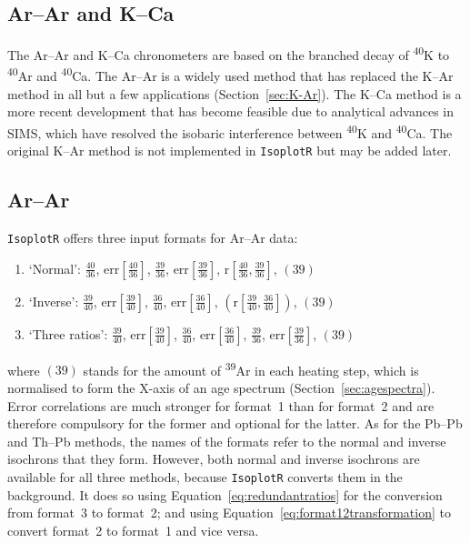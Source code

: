 \begin{refsection}

\chapter{Ar--Ar and K--Ca}\label{ch:ArArKCa}

The Ar--Ar and K--Ca chronometers are based on the branched decay of
\textsuperscript{40}K to \textsuperscript{40}Ar and
\textsuperscript{40}Ca. The Ar--Ar is a widely used method that has
replaced the K--Ar method in all but a few applications
(Section~\ref{sec:K-Ar}). The K--Ca method is a more recent
development that has become feasible due to analytical advances in
SIMS, which have resolved the isobaric interference between
\textsuperscript{40}K and \textsuperscript{40}Ca. The original K--Ar
method is not implemented in \texttt{IsoplotR} but may be added later.

\section{Ar--Ar}

\texttt{IsoplotR} offers three input formats for Ar--Ar data:
\begin{enumerate}
\item{`Normal':}
  $\frac{40}{36}$,  
  $\mbox{err}\!\left[\frac{40}{36}\right]$, 
  $\frac{39}{36}$,  
  $\mbox{err}\!\left[\frac{39}{36}\right]$,  
  $\mbox{r}\!\left[\frac{40}{36},\frac{39}{36}\right]$,
  $\left(39\right)$
\item{`Inverse':}
  $\frac{39}{40}$,  
  $\mbox{err}\!\left[\frac{39}{40}\right]$, 
  $\frac{36}{40}$,  
  $\mbox{err}\!\left[\frac{36}{40}\right]$,  
  $\left(\mbox{r}\!\left[\frac{39}{40},\frac{36}{40}\right]\right)$,
  $\left(39\right)$
\item{`Three ratios':}
  $\frac{39}{40}$,  
  $\mbox{err}\!\left[\frac{39}{40}\right]$, 
  $\frac{36}{40}$,  
  $\mbox{err}\!\left[\frac{36}{40}\right]$,  
  $\frac{39}{36}$,  
  $\mbox{err}\!\left[\frac{39}{36}\right]$,
  $\left(39\right)$
\end{enumerate}

\noindent where $(39)$ stands for the amount of \textsuperscript{39}Ar
in each heating step, which is normalised to form the X-axis of an age
spectrum (Section~\ref{sec:agespectra}). Error correlations are much
stronger for format~1 than for format~2 and are therefore compulsory
for the former and optional for the latter. As for the Pb--Pb and
Th--Pb methods, the names of the formats refer to the normal and
inverse isochrons that they form. However, both normal and inverse
isochrons are available for all three methods, because
\texttt{IsoplotR} converts them in the background. It does so using
Equation~\ref{eq:redundantratios} for the conversion from format~3 to
format~2; and using Equation~\ref{eq:format12transformation} to
convert format~2 to format~1 and vice versa.\\


\end{refsection}
